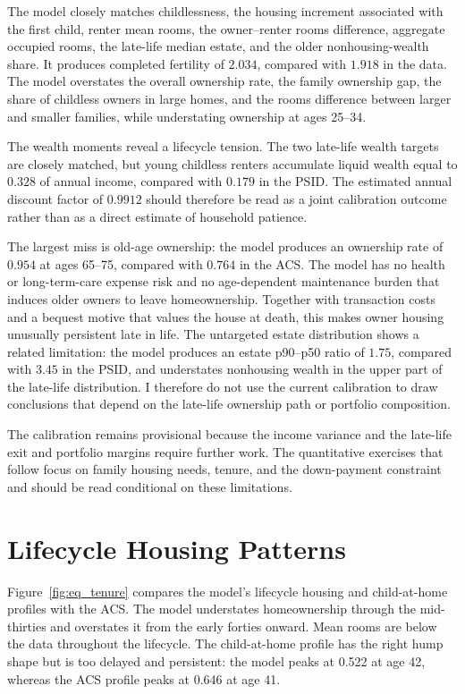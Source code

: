 \documentclass[11pt]{article}
\theoremstyle{definition}
\newcommand{\1}{\mathbf 1}
\begin{document}
The model closely matches childlessness, the housing increment associated with
the first child, renter mean rooms, the owner--renter rooms difference,
aggregate occupied rooms, the late-life median estate, and the older
nonhousing-wealth share. It produces completed fertility of $2.034$, compared
with $1.918$ in the data. The model overstates the overall ownership rate, the
family ownership gap, the share of childless owners in large homes, and the
rooms difference
between larger and smaller families, while understating ownership at ages
25--34.

The wealth moments reveal a lifecycle tension. The two late-life wealth targets
are closely matched, but young childless renters accumulate liquid wealth equal
to $0.328$ of annual income, compared with $0.179$ in the PSID. The estimated
annual discount factor of $0.9912$ should therefore be read as a joint
calibration outcome rather than as a direct estimate of household patience.

The largest miss is old-age ownership: the model produces an ownership rate of
$0.954$ at ages 65--75, compared with $0.764$ in the ACS. The model has no
health or long-term-care expense risk and no age-dependent maintenance burden
that induces older owners to leave homeownership. Together with transaction
costs and a bequest motive that values the house at death, this makes owner
housing unusually persistent late in life. The untargeted estate distribution
shows a related limitation: the model produces an estate p90--p50 ratio of
$1.75$, compared with $3.45$ in the PSID, and understates nonhousing wealth in
the upper part of the late-life distribution. I therefore do not use the
current calibration to draw conclusions that depend on the late-life ownership
path or portfolio composition.

The calibration remains provisional because the income variance and the
late-life exit and portfolio margins require further work. The quantitative
exercises that follow focus on family housing needs, tenure, and the
down-payment constraint and should be read conditional on these limitations.
\section{Lifecycle Housing Patterns}
\label{sec:quant_baseline}

Figure~\ref{fig:eq_tenure} compares the model's lifecycle housing and
child-at-home profiles with the ACS. The model understates homeownership through
the mid-thirties and overstates it from the early forties onward. Mean rooms are
below the data throughout the lifecycle. The child-at-home profile has the right
hump shape but is too delayed and persistent: the model peaks at 0.522 at age 42,
whereas the ACS profile peaks at 0.646 at age 41.
\end{document}
